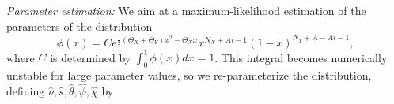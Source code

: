 \documentclass[10pt,a4paper]{article}
\begin{document}
	\textit{Parameter estimation:} We aim at a maximum-likelihood estimation of the parameters of the distribution
	\begin{equation*}
		\phi(x) = Ce^{\frac{1}{2}\left(\Theta_X + \Theta_Y\right)x^2 - \Theta_X x}x^{N_X + Ai - 1}\left(1-x\right)^{N_Y+A - Ai - 1},
	\end{equation*}
	where $C$ is determined by $\int_{0}^{1} \phi(x) dx = 1$. This integral becomes numerically unstable for large parameter values, so we re-parameterize the distribution, defining $\hat{\nu},\hat{s},\hat{\theta},\hat{\psi},\hat{\chi}$ by
	
	
\end{document}
